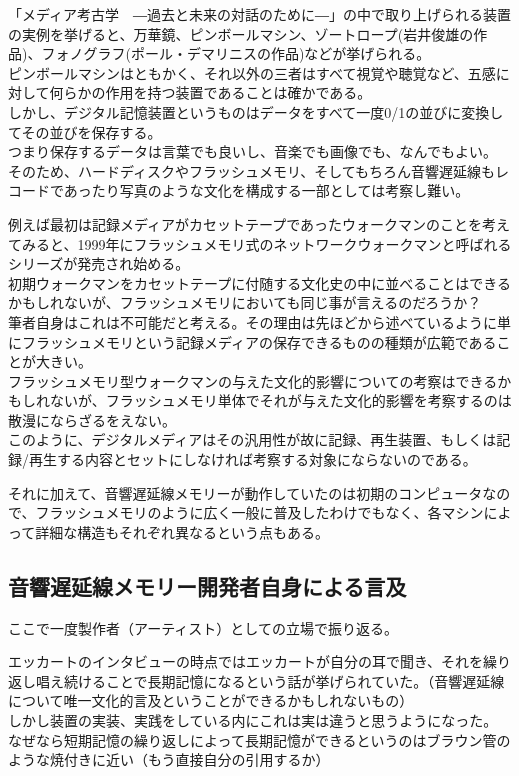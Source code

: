 「メディア考古学　―過去と未来の対話のために―」の中で取り上げられる装置の実例を挙げると、万華鏡、ピンボールマシン、ゾートロープ(岩井俊雄の作品)、フォノグラフ(ポール・デマリニスの作品)などが挙げられる。\\
ピンボールマシンはともかく、それ以外の三者はすべて視覚や聴覚など、五感に対して何らかの作用を持つ装置であることは確かである。\\
しかし、デジタル記憶装置というものはデータをすべて一度0/1の並びに変換してその並びを保存する。\\
つまり保存するデータは言葉でも良いし、音楽でも画像でも、なんでもよい。\\
そのため、ハードディスクやフラッシュメモリ、そしてもちろん音響遅延線もレコードであったり写真のような文化を構成する一部としては考察し難い。

例えば最初は記録メディアがカセットテープであったウォークマンのことを考えてみると、1999年にフラッシュメモリ式のネットワークウォークマンと呼ばれるシリーズが発売され始める。\\
初期ウォークマンをカセットテープに付随する文化史の中に並べることはできるかもしれないが、フラッシュメモリにおいても同じ事が言えるのだろうか？\\
筆者自身はこれは不可能だと考える。その理由は先ほどから述べているように単にフラッシュメモリという記録メディアの保存できるものの種類が広範であることが大きい。\\
フラッシュメモリ型ウォークマンの与えた文化的影響についての考察はできるかもしれないが、フラッシュメモリ単体でそれが与えた文化的影響を考察するのは散漫にならざるをえない。\\
このように、デジタルメディアはその汎用性が故に記録、再生装置、もしくは記録/再生する内容とセットにしなければ考察する対象にならないのである。

それに加えて、音響遅延線メモリーが動作していたのは初期のコンピュータなので、フラッシュメモリのように広く一般に普及したわけでもなく、各マシンによって詳細な構造もそれぞれ異なるという点もある。

\subsection{音響遅延線メモリー開発者自身による言及}\label{ux97f3ux97ffux9045ux5ef6ux7ddaux30e1ux30e2ux30eaux30fcux958bux767aux8005ux81eaux8eabux306bux3088ux308bux8a00ux53ca}

ここで一度製作者（アーティスト）としての立場で振り返る。

エッカートのインタビューの時点ではエッカートが自分の耳で聞き、それを繰り返し唱え続けることで長期記憶になるという話が挙げられていた。（音響遅延線について唯一文化的言及ということができるかもしれないもの）\\
しかし装置の実装、実践をしている内にこれは実は違うと思うようになった。\\
なぜなら短期記憶の繰り返しによって長期記憶ができるというのはブラウン管のような焼付きに近い（もう直接自分の引用するか）

